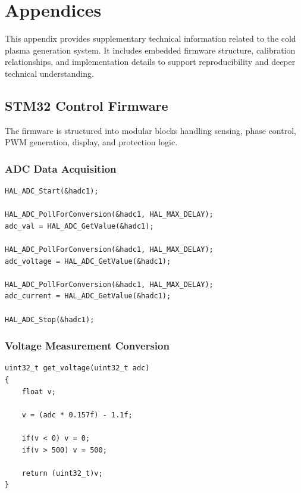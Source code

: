 \chapter{Appendices} \label{chap-app}
\thispagestyle{empty}

This appendix provides supplementary technical information related to the cold plasma generation system. It includes embedded firmware structure, calibration relationships, and implementation details to support reproducibility and deeper technical understanding.

\vspace{0.3cm}

\section{STM32 Control Firmware}

The firmware is structured into modular blocks handling sensing, phase control, PWM generation, display, and protection logic.

\vspace{0.3cm}

\subsection{ADC Data Acquisition}

\begin{lstlisting}[caption={ADC Sampling for Phase, Voltage and Current}]
HAL_ADC_Start(&hadc1);

HAL_ADC_PollForConversion(&hadc1, HAL_MAX_DELAY);
adc_val = HAL_ADC_GetValue(&hadc1);

HAL_ADC_PollForConversion(&hadc1, HAL_MAX_DELAY);
adc_voltage = HAL_ADC_GetValue(&hadc1);

HAL_ADC_PollForConversion(&hadc1, HAL_MAX_DELAY);
adc_current = HAL_ADC_GetValue(&hadc1);

HAL_ADC_Stop(&hadc1);
\end{lstlisting}


\subsection{Voltage Measurement Conversion}

\begin{lstlisting}[caption={Voltage Sensor Conversion Function}]
uint32_t get_voltage(uint32_t adc)
{
    float v;

    v = (adc * 0.157f) - 1.1f;

    if(v < 0) v = 0;
    if(v > 500) v = 500;

    return (uint32_t)v;
}
\end{lstlisting}

